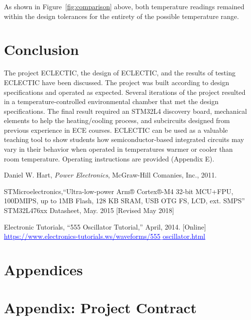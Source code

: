 \documentclass[11pt,letter]{article}
\begin{document}
As shown in Figure~\ref{fig:comparison} above, both temperature readings remained within the design tolerances for the entirety of the possible temperature range.

\section{Conclusion}

The project ECLECTIC, the design of ECLECTIC, and the results of testing ECLECTIC have been discussed. The project was built according to design specifications and operated as expected. Several iterations of the project resulted in a temperature-controlled environmental chamber that met the design specifications. The final result required an STM32L4 discovery board, mechanical elements to help the heating/cooling process, and subcircuits designed from previous experience in ECE courses. ECLECTIC can be used as a valuable teaching tool to show students how semiconductor-based integrated circuits may vary in their behavior when operated in temperatures warmer or cooler than room temperature. Operating instructions are provided (Appendix E). 

\begin{thebibliography}{9}
Daniel W. Hart, \textit{Power Electronics}, McGraw-Hill Comanies, Inc., 2011.

STMicroelectronics,``Ultra-low-power Arm® Cortex®-M4 32-bit MCU+FPU, 100DMIPS, up to 1MB Flash, 128 KB SRAM, USB OTG FS, LCD, ext. SMPS'' STM32L476xx Datasheet, May. 2015
[Revised May 2018]

Electronic Tutorials, ``555 Oscillator Tutorial,'' April, 2014. [Online] \newline
\textcolor{blue}{\underline{https://www.electronics-tutorials.ws/waveforms/555$\_$oscillator.html}} 
\end{thebibliography}

\newpage



\appendix

\section*{Appendices}

\section{Appendix: Project Contract}
\end{document}
